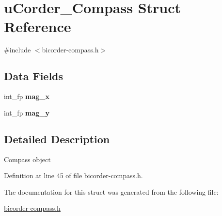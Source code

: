 \hypertarget{structuCorder__Compass}{}\section{u\+Corder\+\_\+\+Compass Struct Reference}
\label{structuCorder__Compass}


{\ttfamily \#include $<$bicorder-\/compass.\+h$>$}

\subsection*{Data Fields}
\begin{DoxyCompactItemize}
\item 
int\+\_\+fp {\bfseries mag\+\_\+x}\hypertarget{structuCorder__Compass_af41d1cdaeeb99641aa280adacf2074dd}{}\label{structuCorder__Compass_af41d1cdaeeb99641aa280adacf2074dd}

\item 
int\+\_\+fp {\bfseries mag\+\_\+y}\hypertarget{structuCorder__Compass_ac29f03e0c84d9e4ff922482f0db83e07}{}\label{structuCorder__Compass_ac29f03e0c84d9e4ff922482f0db83e07}

\end{DoxyCompactItemize}


\subsection{Detailed Description}
Compass object 

Definition at line 45 of file bicorder-\/compass.\+h.



The documentation for this struct was generated from the following file\+:\begin{DoxyCompactItemize}
\item 
\hyperlink{bicorder-compass_8h}{bicorder-\/compass.\+h}\end{DoxyCompactItemize}
